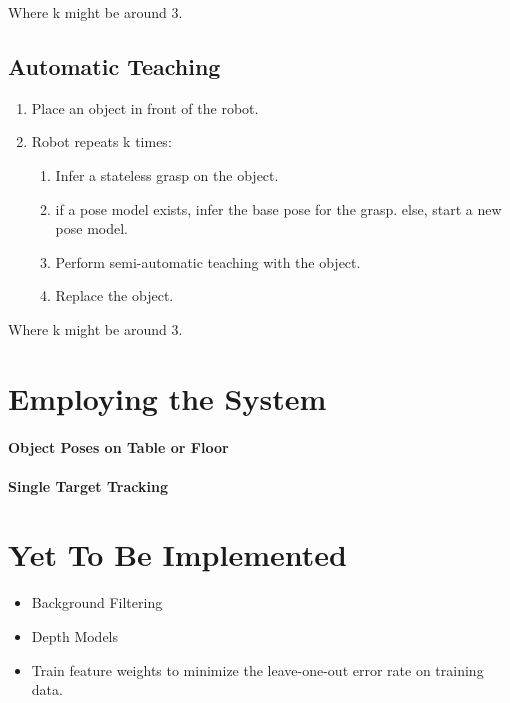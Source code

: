 \documentclass[12pt]{article}
\numberwithin{equation}{section}
\numberwithin{table}{section}
\numberwithin{figure}{section}
\begin{document}
Where k might be around 3.

\subsection{Automatic Teaching}
\begin{enumerate}
  \item Place an object in front of the robot.
  \item Robot repeats k times:
  \begin{enumerate}
    \item Infer a stateless grasp on the object.
    \item if a pose model exists, infer the base pose for the grasp. else, start a new pose model.
    \item Perform semi-automatic teaching with the object.
    \item Replace the object.
  \end{enumerate}
\end{enumerate}

Where k might be around 3.

\section{Employing the System}
\paragraph{Object Poses on Table or Floor}
\paragraph{Single Target Tracking}

\section{Yet To Be Implemented}

\begin{itemize}
  \item Background Filtering
  \item Depth Models
  \item Train feature weights to minimize the leave-one-out error rate on training data.
\end{itemize}



\end{document}

